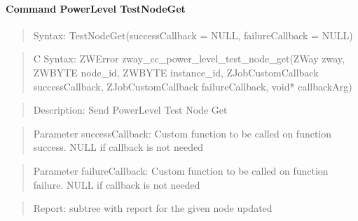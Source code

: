 \paragraph{Command PowerLevel TestNodeGet}
\begin{quote}Syntax: TestNodeGet(successCallback = NULL, failureCallback = NULL)\end{quote}
\begin{quote}C Syntax: ZWError zway\_cc\_power\_level\_test\_node\_get(ZWay zway, ZWBYTE node\_id, ZWBYTE instance\_id, ZJobCustomCallback successCallback, ZJobCustomCallback failureCallback, void* callbackArg)\end{quote}
\begin{quote}Description: Send PowerLevel Test Node Get\end{quote}
\begin{quote}Parameter successCallback: Custom function to be called on function success. NULL if callback is not needed\end{quote}
\begin{quote}Parameter failureCallback: Custom function to be called on function failure. NULL if callback is not needed\end{quote}
\begin{quote}Report: subtree with report for the given node updated\end{quote}


